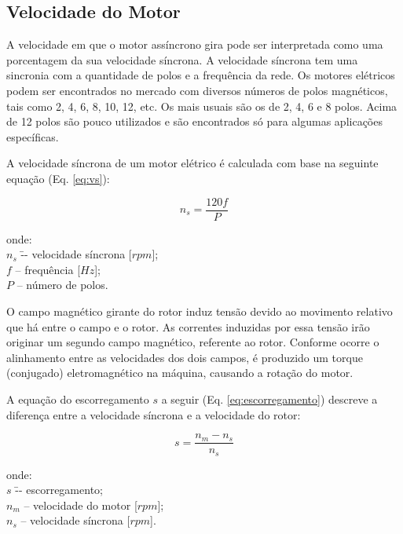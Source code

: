 \documentclass[a4paper,12pt,oneside]{article}
\begin{document}
\subsection{Velocidade do Motor}\hspace{0pt}

A velocidade em que o motor assíncrono gira pode ser interpretada como uma porcentagem da sua velocidade síncrona. A velocidade síncrona tem uma sincronia com a quantidade de polos e a frequência da rede. Os motores elétricos podem ser encontrados no mercado com diversos números de polos magnéticos, tais como 2, 4, 6, 8, 10, 12, etc. Os mais usuais são os de 2, 4, 6 e 8 polos. Acima de 12 polos são pouco utilizados e são encontrados só para algumas aplicações específicas.

A velocidade síncrona de um motor elétrico é calculada com base na seguinte equação (Eq. \ref{eq:vs}):

\begin{equation}\label{eq:vs}
n_s = \frac{120f}{P}
\end{equation}

\begin{tabbing}
onde:\= \\
\> $n_s$ \= -- velocidade síncrona [$rpm$];\\
\> $f$ \> -- frequência [$Hz$];\\
\> $P$ \> -- número de polos.
\end{tabbing}

O campo magnético girante do rotor induz tensão devido ao movimento relativo que há entre o campo e o rotor. As correntes induzidas por essa tensão irão originar um segundo campo magnético, referente ao rotor. Conforme ocorre o alinhamento entre as velocidades dos dois campos, é produzido um torque (conjugado) eletromagnético na máquina, causando a rotação do motor. 

A equação do escorregamento $s$ a seguir (Eq. \ref{eq:escorregamento}) descreve a diferença entre a velocidade síncrona e a velocidade do rotor:

\begin{equation}\label{eq:escorregamento}
s = \frac{n_m - n_s}{n_s}
\end{equation}

\begin{tabbing}
onde:\= \\
\> $s$ \= -- escorregamento;\\
\> $n_m$ \> -- velocidade do motor [$rpm$];\\
\> $n_s$ \> -- velocidade síncrona [$rpm$].
\end{tabbing}
\end{document}
